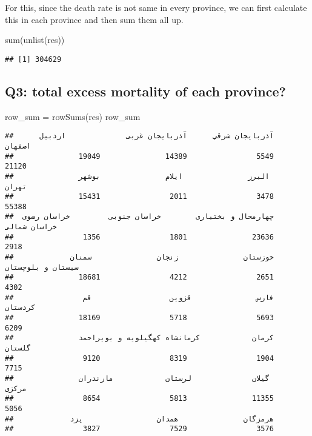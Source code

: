 \documentclass[
]{article}
\newenvironment{Shaded}{\begin{snugshade}}{\end{snugshade}}
\newcommand{\FunctionTok}[1]{\textcolor[rgb]{0.00,0.00,0.00}{#1}}
\newcommand{\NormalTok}[1]{#1}
\newcommand{\OtherTok}[1]{\textcolor[rgb]{0.56,0.35,0.01}{#1}}
\begin{document}
For this, since the death rate is not same in every province, we can
first calculate this in each province and then sum them all up.

\begin{Shaded}
\begin{Highlighting}[]
\FunctionTok{sum}\NormalTok{(}\FunctionTok{unlist}\NormalTok{(res))}
\end{Highlighting}
\end{Shaded}

\begin{verbatim}
## [1] 304629
\end{verbatim}

\hypertarget{q3-total-excess-mortality-of-each-province}{%
\subsection{Q3: total excess mortality of each
province?}\label{q3-total-excess-mortality-of-each-province}}

\begin{Shaded}
\begin{Highlighting}[]
\NormalTok{row\_sum }\OtherTok{=} \FunctionTok{rowSums}\NormalTok{(res)}
\NormalTok{row\_sum}
\end{Highlighting}
\end{Shaded}

\begin{verbatim}
##      آذربايجان شرقي      آذربايجان غربی              اردبیل              اصفهان 
##               19049               14389                5549               21120 
##               البرز               ایلام               بوشهر               تهران 
##               15431                2011                3478               55388 
##  چهارمحال و بختیاری        خراسان جنوبی         خراسان رضوی        خراسان شمالی 
##                1356                1801               23636                2918 
##             خوزستان               زنجان               سمنان   سیستان و بلوچستان 
##               18681                4212                2651                4302 
##                فارس               قزوین                  قم             کردستان 
##               18169                5718                5693                6209 
##               کرمان            کرمانشاه کهگیلویه و بویراحمد              گلستان 
##                9120                8319                1904                7715 
##               گیلان              لرستان            مازندران               مرکزی 
##                8654                5813               11355                5056 
##             هرمزگان               همدان                 یزد 
##                3827                7529                3576
\end{verbatim}
\end{document}

